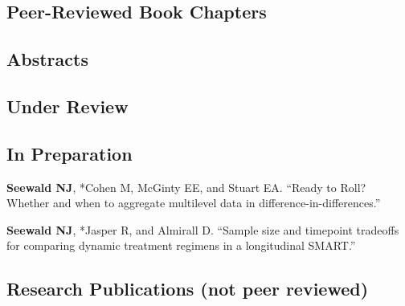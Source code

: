 \documentclass[letterpaper,11pt]{article} %
\begin{document}
	\subsection*{Peer-Reviewed Book Chapters}
    	\begin{refsection}
    		\nocite{*}
    		\printbibliography[heading=none,type=incollection]
    	\end{refsection}

    \subsection*{Abstracts}
        \begin{refsection}[abstracts]
            \nocite{*}
            \printbibliography[heading=none,type=inproceedings]
        \end{refsection}
		
	\subsection*{Under Review}
    	\begin{refsection}[underreview]
    		\nocite{*}
    		\printbibliography[heading=none]
    	\end{refsection}
	
	\subsection*{In Preparation}
    	\begin{etaremune}
    		\item \textbf{Seewald NJ}, *Cohen M, McGinty EE, and Stuart EA. ``Ready to Roll? Whether and when to aggregate multilevel data in difference-in-differences.'' 
    		
    		\item \textbf{Seewald NJ}, *Jasper R, and Almirall D. ``Sample size and timepoint tradeoffs for comparing dynamic treatment regimens in a longitudinal SMART.''
    	\end{etaremune}
	
	\subsection*{Research Publications (not peer reviewed)}
        \begin{refsection}[preprints]
            \nocite{*}
            \printbibliography[heading=none]
        \end{refsection}
	
\end{document}
